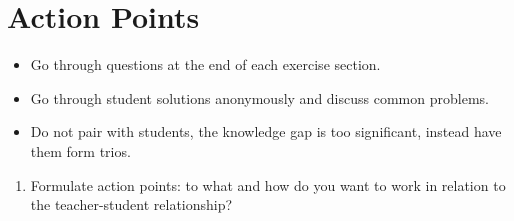 \documentclass[paper=a4,justified,a4paper]{tufte-handout}
\providecommand{\tightlist}{%
  \setlength{\itemsep}{0pt}\setlength{\parskip}{0pt}}
\begin{document}
\hypertarget{action-points}{%
\section{Action Points}\label{action-points}}

\begin{itemize}
\tightlist
\item
  Go through questions at the end of each exercise section.
\item
  Go through student solutions anonymously and discuss common problems.
\item
  Do not pair with students, the knowledge gap is too significant,
  instead have them form trios.
\end{itemize}

\begin{enumerate}
\def\labelenumi{\arabic{enumi}.}
\setcounter{enumi}{4}
\tightlist
\item
  Formulate action points: to what and how do you want to work in
  relation to the teacher-student relationship?
\end{enumerate}
\end{document}
